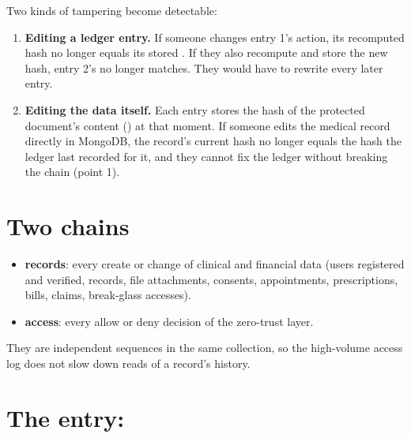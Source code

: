 Two kinds of tampering become detectable:

\begin{enumerate}
  \item \textbf{Editing a ledger entry.} If someone changes entry 1's action, its
    recomputed hash no longer equals its stored . If they also
    recompute and store the new hash, entry 2's  no
    longer matches. They would have to rewrite every later entry.
  \item \textbf{Editing the data itself.} Each entry stores the hash of the
    protected document's content () at that moment. If someone
    edits the medical record directly in MongoDB, the record's current hash no
    longer equals the hash the ledger last recorded for it, and they cannot fix
    the ledger without breaking the chain (point 1).
\end{enumerate}

\section{Two chains}

\begin{itemize}
  \item \textbf{records}: every create or change of clinical and financial data
    (users registered and verified, records, file attachments, consents,
    appointments, prescriptions, bills, claims, break-glass accesses).
  \item \textbf{access}: every allow or deny decision of the zero-trust layer.
\end{itemize}

They are independent sequences in the same collection, so the high-volume
access log does not slow down reads of a record's history.

\section{The entry: }

